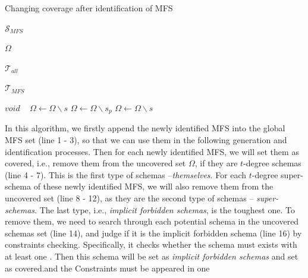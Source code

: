 \documentclass{sig-alternate}
\begin{document}
\begin{algorithm}
  \caption{Changing coverage after identification of MFS}
  \begin{algorithmic}[1]
     \Require



     $\mathcal{S}_{MFS}$ 

     $\Omega$ 
     

     $\mathcal{T}_{all}$ 
     
     $\mathcal{T}_{MFS}$ 

\Ensure  $void$ 
\
          \State $\Omega \leftarrow \Omega \backslash s$
       \EndIf
          \State $\Omega \leftarrow \Omega \backslash s_{p}$
         \EndIf
       \EndFor
     \EndFor
         \State  $\Omega \leftarrow \Omega \backslash s$
       \EndIf
     \EndFor
  \end{algorithmic}
\end{algorithm}

 In this algorithm, we firstly append the newly identified MFS into the global MFS set (line 1 - 3), so that we can use them in the following generation and identification processes. Then for each newly identified MFS, we will set them as covered, i.e., remove them from the uncovered set $\Omega$, if they are $t$-degree schemas (line 4 - 7). This is the first type of schemas --\emph{themselves}. For each $t$-degree super-schema of these newly identified MFS, we will also remove them from the uncovered set (line 8 - 12), as they are the second type of schemas --  \emph{super-schemas}. The last type, i.e., \emph{implicit forbidden schemas}, is the toughest one. To remove them, we need to search through each potential schema in the uncovered schemas set (line 14), and judge if it is the implicit forbidden schema (line 16) by constraints checking. Specifically, it checks whether the schema must exists with at least one . Then this schema will be set as \emph{implicit forbidden schemas} and set as covered.and the Constraints must be appeared in one
 
\end{document}
